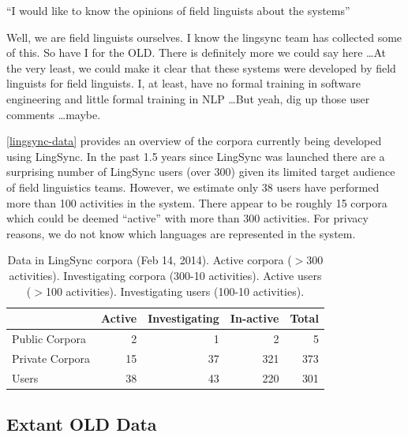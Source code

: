 \documentclass[11pt]{article}
\begin{document}
``I would like to know the opinions of field linguists about the systems''

Well, we are field linguists ourselves. I know the lingsync team has collected some of this.
So have I for the OLD. There is definitely more we could say here \ldots At the
very least, we could make it clear that these systems were developed by field
linguists for field linguists. I, at least, have no formal training in software
engineering and little formal training in NLP \ldots But yeah, dig up those user
comments \ldots maybe.



\autoref{lingsync-data} provides an overview of the corpora currently being
developed using LingSync. In the past 1.5 years since LingSync was launched
there are a surprising number of LingSync users (over 300) given its limited
target audience of field linguistics teams. However, we estimate only 38 users
have performed more than 100 activities in the system. There appear to be
roughly 15 corpora which could be deemed ``active'' with more than 300
activities. For privacy reasons, we do not know which languages are represented
in the system.

\begin{table}[h]
\begin{center}
\scriptsize
\begin{tabular}{lrrrr}
      \toprule
                     ~ &  Active & Investigating & In-active & Total\\
      \midrule
      Public Corpora  &       2 &   1 &   2 & 5 \\ 
      Private Corpora &      15 &  37 & 321 & 373\\ 
      Users           &      38 &  43 & 220 & 301 \\
      \bottomrule

\end{tabular}
\caption{Data in LingSync corpora (Feb 14, 2014).
Active corpora ($>$300 activities). Investigating corpora (300-10 activities). Active users ($>$100 activities). Investigating users (100-10 activities).}
\label{lingsync-data}
 \end{center}
 \normalsize
\end{table}



\subsection{Extant OLD Data}
\end{document}
